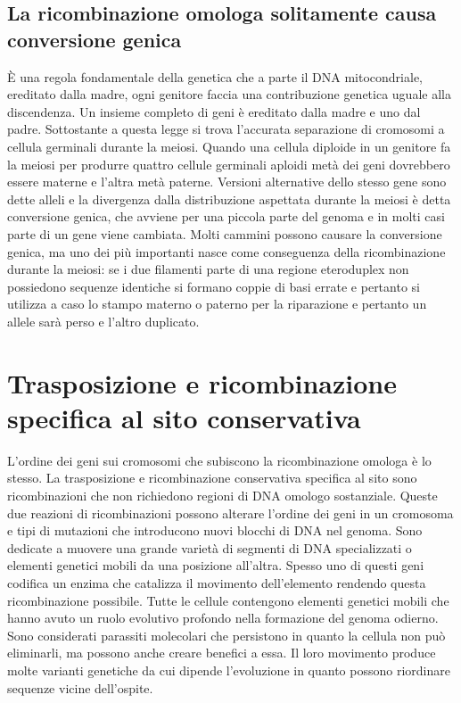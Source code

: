 \subsection{La ricombinazione omologa solitamente causa conversione genica}
\`E una regola fondamentale della genetica che a parte il DNA mitocondriale, ereditato dalla madre, ogni genitore faccia una contribuzione genetica uguale alla discendenza. Un insieme
completo di geni \`e ereditato dalla madre e uno dal padre. Sottostante a questa legge si trova l'accurata separazione di cromosomi a cellula germinali durante la meiosi. Quando una 
cellula diploide in un genitore fa la meiosi per produrre quattro cellule germinali aploidi met\`a dei geni dovrebbero essere materne e l'altra met\`a paterne. Versioni alternative dello
stesso gene sono dette alleli e la divergenza dalla distribuzione aspettata durante la meiosi \`e detta conversione genica, che avviene per una piccola parte del genoma e in molti casi
parte di un gene viene cambiata. Molti cammini possono causare la conversione genica, ma uno dei pi\`u importanti nasce come conseguenza della ricombinazione durante la meiosi: se i
due filamenti parte di una regione eteroduplex non possiedono sequenze identiche si formano coppie di basi errate e pertanto si utilizza a caso lo stampo materno o paterno per la 
riparazione e pertanto un allele sar\`a perso e l'altro duplicato. 
\section{Trasposizione e ricombinazione specifica al sito conservativa}
L'ordine dei geni sui cromosomi che subiscono la ricombinazione omologa \`e lo stesso. La trasposizione e ricombinazione conservativa specifica al sito sono ricombinazioni che non
richiedono regioni di DNA omologo sostanziale. Queste due reazioni di ricombinazioni possono alterare l'ordine dei geni in un cromosoma e tipi di mutazioni che introducono nuovi blocchi
di DNA nel genoma. Sono dedicate a muovere una grande variet\`a di segmenti di DNA specializzati o elementi genetici mobili da una posizione all'altra. Spesso uno di questi geni codifica
un enzima che catalizza il movimento dell'elemento rendendo questa ricombinazione possibile. Tutte le cellule contengono elementi genetici mobili che hanno avuto un ruolo evolutivo
profondo nella formazione del genoma odierno. Sono considerati parassiti molecolari che persistono in quanto la cellula non pu\`o eliminarli, ma possono anche creare benefici a essa. Il
loro movimento produce molte varianti genetiche da cui dipende l'evoluzione in quanto possono riordinare sequenze vicine dell'ospite. 
